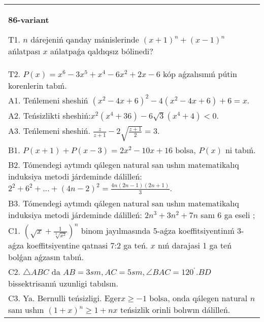 \documentclass{article}
\begin{document}
\begin{tabular}{m{17cm}}
\textbf{86-variant}
\newline

T1. \(n\) dárejeniń qanday mánislerinde \((x + 1)^{n} + (x - 1)^{n}\) ańlatpası \(x\) ańlatpaǵa qaldıqsız bólinedi? \\
T2. \(P(x) = x^{6} - 3x^{5} + x^{4} - 6x^{2} + 2x - 6\) kóp aǵzalısınıń pútin korenlerin tabıń. \\
A1. Teńlemeni sheshiń \(\left( x^{2} - 4x + 6 \right)^{2} - 4\left( x^{2} - 4x + 6 \right) + 6 = x\). \\
A2. Teńsizlikti sheshiń:\(x^{2}\left( x^{4} + 36 \right) - 6\sqrt{3}\left( x^{4} + 4 \right) < 0\). \\
A3. Teńlemeni sheshiń. \(\frac{z}{z + 1} - 2\sqrt{\frac{z + 1}{2}} = 3\). \\
B1. \(P(x + 1) + P(x - 3) = 2x^{2} - 10x + 16\) bolsa, \(P(x)\) ni tabıń. \\
B2. Tómendegi aytımdı qálegen natural san ushın matematikalıq induksiya metodi járdeminde dálilleń: \(2^{2} + 6^{2} + \ldots + (4n - 2)^{2} = \frac{4n(2n - 1)(2n + 1)}{3}\). \\
B3. Tómendegi aytımdı qálegen natural san ushın matematikalıq induksiya metodi járdeminde dálilleń: \(2n^{3} + 3n^{2} + 7n\) sanı 6 ga eseli ; \\
C1. \(\left( \sqrt{x} + \frac{1}{\sqrt[3]{x^{2}}} \right)^{n}\) binom jayılmasında 5-aǵza koeffitsiyentinıń 3-aǵza koeffitsiyentine qatnasi 7:2 ga teń. \(x\) nıń darajasi 1 ga teń bolǵan aǵzasın tabıń. \\
C2. \(\bigtriangleup ABC\) da \(AB = 3sm,AC = 5sm,\angle BAC = 120^{{^\circ}}.BD\) bissektrisanıń uzunligi tabılsın. \\
C3. Ya. Bernulli teńsizligi. Eger\(x \geq - 1\) bolsa, onda qálegen natural \(n\) sanı ushın \((1 + x)^{n} \geq 1 + nx\) teńsizlik orinli bolıwın dálilleń. \\

\end{tabular}
\vspace{1cm}
\end{document}
